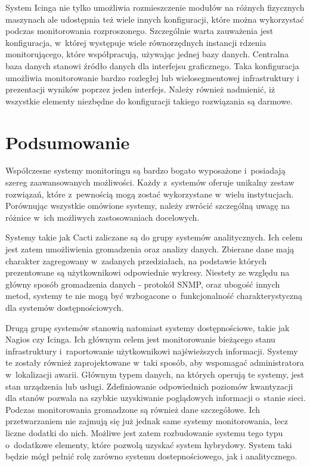 System Icinga nie tylko umożliwia rozmieszczenie modułów na różnych
fizycznych maszynach ale udostępnia też wiele innych konfiguracji,
które można wykorzystać podczas monitorowania
rozproszonego. Szczególnie warta zauważenia jest konfiguracja,
w~której występuje wiele równorzędnych instancji rdzenia
monitorującego, które współpracują, używając jednej bazy
danych. Centralna baza danych stanowi źródło danych dla interfejsu
graficznego. Taka konfiguracja umożliwia monitorowanie bardzo
rozległej lub wielosegmentowej infrastruktury i prezentacji wyników
poprzez jeden interfejs. Należy również nadmienić, iż wszystkie
elementy niezbędne do konfiguracji takiego rozwiązania są darmowe.

\section[Podsumowanie][Podsumowanie]{Podsumowanie}

Współczesne systemy monitoringu są bardzo bogato wyposażone
i~posiadają szereg zaawansowanych możliwości. Każdy z~systemów oferuje
unikalny zestaw rozwiązań, które z~pewnością mogą zostać wykorzystane
w~wielu instytucjach. Porównując wszystkie omówione systemy, należy
zwrócić szczególną uwagę na różnice w~ich możliwych zastosowaniach
docelowych.

Systemy takie jak Cacti zaliczane są do grupy systemów
analitycznych. Ich celem jest zatem umożliwienia gromadzenia oraz
analizy danych. Zbierane dane mają charakter zagregowany w~zadanych
przedziałach, na podstawie których prezentowane są użytkownikowi
odpowiednie wykresy. Niestety ze względu na główny sposób gromadzenia
danych - protokół SNMP, oraz ubogość innych metod, systemy te nie mogą
być wzbogacone o~funkcjonalność charakterystyczną dla systemów
dostępnościowych.

Drugą grupę systemów stanowią natomiast systemy dostępnościowe, takie
jak Nagios czy Icinga. Ich głównym celem jest monitorowanie bieżącego
stanu infrastruktury i~raportowanie użytkownikowi najświeższych
informacji. Systemy te zostały również zaprojektowane w~taki sposób,
aby wspomagać administratora w~lokalizacji awarii. Głównym typem
danych, na których operują te systemy, jest stan urządzenia lub
usługi. Zdefiniowanie odpowiednich poziomów kwantyzacji dla stanów
pozwala na szybkie uzyskiwanie poglądowych informacji o~stanie
sieci. Podczas monitorowania gromadzone są również dane
szczegółowe. Ich przetwarzaniem nie zajmują się już jednak same
systemy monitorowania, lecz liczne dodatki do nich. Możliwe jest zatem
rozbudowanie systemu tego typu o~dodatkowe elementy, które pozwolą
uzyskać system hybrydowy. System taki będzie mógł pełnić rolę zarówno
systemu dostepnościowego, jak i analitycznego.

